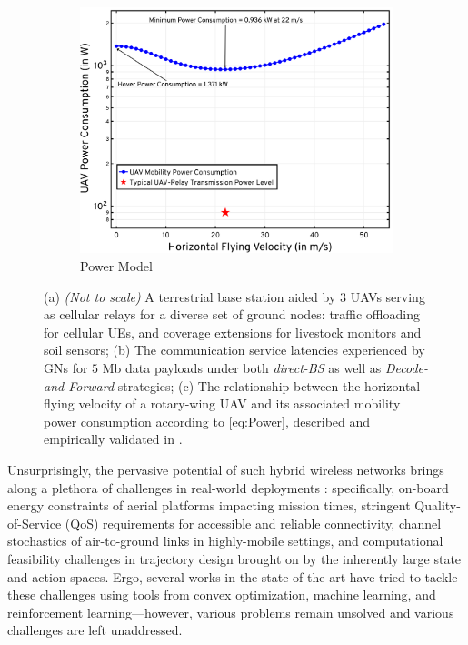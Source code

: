 \documentclass[12pt, draftcls, onecolumn]{IEEEtran}
\theoremstyle{plain}
\theoremstyle{definition}
\theoremstyle{remark}
\begin{document}
\begin{figure} [t]
\begin{subfigure}{0.325\linewidth}
         \includegraphics[width=0.9\linewidth]{figs/Power_Model.png}
         \caption{Power Model}
         \label{F3}
     \end{subfigure}
     \caption{(a) \emph{(Not to scale)} A terrestrial base station aided by $3$ UAVs serving as cellular relays for a diverse set of ground nodes: traffic offloading for cellular UEs, and coverage extensions for livestock monitors and soil sensors; (b) The communication service latencies experienced by GNs for $5$ Mb data payloads under both \emph{direct-BS} as well as \emph{Decode-and-Forward} strategies; (c) The relationship between the horizontal flying velocity of a rotary-wing UAV and its associated mobility power consumption according to \eqref{eq:Power}, described and empirically validated in \cite{SCA}.}
     \label{F1F2andF3}
     \vspace{-10mm}
\end{figure}

Unsurprisingly, the pervasive potential of such hybrid wireless networks brings along a plethora of challenges in real-world deployments \cite{FundamentalTradeoffs}: specifically, on-board energy constraints of aerial platforms impacting mission times, stringent Quality-of-Service (QoS) requirements for accessible and reliable connectivity, channel stochastics of air-to-ground links in highly-mobile settings, and computational feasibility challenges in trajectory design brought on by the inherently large state and action spaces. Ergo, several works in the state-of-the-art have tried to tackle these challenges using tools from convex optimization, machine learning, and reinforcement learning---however, various problems remain unsolved and various challenges are left unaddressed. 
\end{document}
